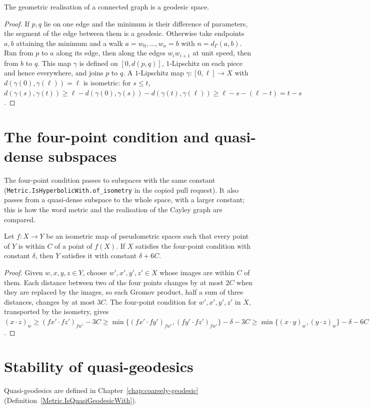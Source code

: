 \begin{lemma}
  \label{SimpleGraph.Realization.isGeodesicSpace}
  The geometric realisation of a connected graph is a geodesic space.
\end{lemma}
\begin{proof}
  If $p, q$ lie on one edge and the minimum is their difference of parameters, the segment of the
  edge between them is a geodesic. Otherwise take endpoints $a, b$ attaining the minimum and a walk
  $a = w_0, \dots, w_n = b$ with $n = d_\Gamma(a, b)$. Run from $p$ to $a$ along its edge, then
  along the edges $w_i w_{i+1}$ at unit speed, then from $b$ to $q$. This map $\gamma$ is defined on
  $[0, d(p, q)]$, $1$-Lipschitz on each piece and hence everywhere, and joins $p$ to $q$. A
  $1$-Lipschitz map $\gamma \colon [0, \ell] \to X$ with $d(\gamma(0), \gamma(\ell)) = \ell$ is
  isometric: for $s \le t$, $d(\gamma(s), \gamma(t)) \ge \ell - d(\gamma(0), \gamma(s)) -
  d(\gamma(t), \gamma(\ell)) \ge \ell - s - (\ell - t) = t - s$.
\end{proof}

\section*{The four-point condition and quasi-dense subspaces}

The four-point condition passes to subspaces with the same constant
(\texttt{Metric.IsHyperbolicWith.of\_isometry} in the copied pull request). It also passes from a
quasi-dense subspace to the whole space, with a larger constant; this is how the word metric and the
realisation of the Cayley graph are compared.

\begin{lemma}
  \label{Metric.IsHyperbolicWith.of_isometry_of_quasiDenseRange}
  Let $f \colon X \to Y$ be an isometric map of pseudometric spaces such that every point of $Y$ is
  within $C$ of a point of $f(X)$. If $X$ satisfies the four-point condition with constant
  $\delta$, then $Y$ satisfies it with constant $\delta + 6C$.
\end{lemma}
\begin{proof}
  Given $w, x, y, z \in Y$, choose $w', x', y', z' \in X$ whose images are within $C$ of them.
  Each distance between two of the four points changes by at most $2C$ when they are replaced by the
  images, so each Gromov product, half a sum of three distances, changes by at most $3C$. The
  four-point condition for $w', x', y', z'$ in $X$, transported by the isometry, gives $(x \cdot
  z)_w \ge (fx' \cdot fz')_{fw'} - 3C \ge \min\{(fx' \cdot fy')_{fw'}, (fy' \cdot fz')_{fw'}\} -
  \delta - 3C \ge \min\{(x \cdot y)_w, (y \cdot z)_w\} - \delta - 6C$.
\end{proof}

\section*{Stability of quasi-geodesics}

Quasi-geodesics are defined in Chapter~\ref{chap:coarsely-geodesic}
(Definition~\ref{Metric.IsQuasiGeodesicWith}).

